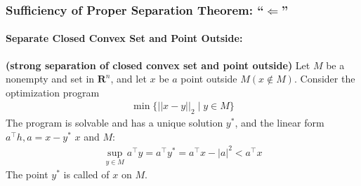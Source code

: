 \documentclass{article}
\newcommand{\bfs}[1]{\textbf{({#1}) }}
\begin{document}
\subsubsection{Sufficiency of Proper Separation Theorem: ``$\Leftarrow$''}
\paragraph{Separate Closed Convex Set and Point Outside:}
\begin{lema}{\bfs{strong separation of closed convex set and point outside}}\label{lem:sep_con_pointnotin}
Let $M$ be a nonempty and  set in $\mathbf{R}^{n}$, and let $x$ be $a$ point outside $M(x \notin M) .$ Consider the optimization program
\begin{align}
\min \{||x-y||_2 \mid y \in M\}\label{eq:opt_mina}
\end{align}
The program is solvable and has a unique solution $y^{*}$, and the linear form $a^{\top} h, a=x-y^{*}$  $x$ and $M:$
\begin{align*}
\sup _{y \in M} a^{\top} y=a^{\top} y^{*}=a^{\top} x-|a|^{2}< a^{\top}x 
\end{align*}
The point $y^{*}$ is called  of $x$ on $M .$ 
\end{lema}
\end{document}
